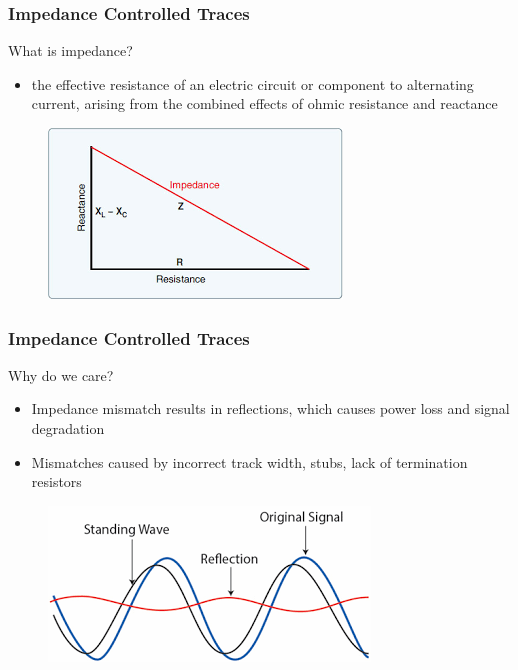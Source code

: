 \documentclass[t]{beamer}
\begin{document}
\begin{frame}
\frametitle{Impedance Controlled Traces}
What is impedance?\\
\begin{itemize}
	\item the effective resistance of an electric circuit or component to alternating current, arising from the combined effects of ohmic resistance and reactance
\end{itemize}
\begin{figure}
	\includegraphics[width=0.5\linewidth]{impedance.png}
\end{figure}

\end{frame}
\begin{frame}
\frametitle{Impedance Controlled Traces}
Why do we care?\\
\begin{itemize}
	\item Impedance mismatch results in reflections, which causes power loss and signal degradation 
	\item Mismatches caused by incorrect track width, stubs, lack of termination resistors 
\end{itemize}
\begin{figure}
	\includegraphics[width=0.8\linewidth]{reflections.png}
\end{figure}

\end{frame}
\end{document}
